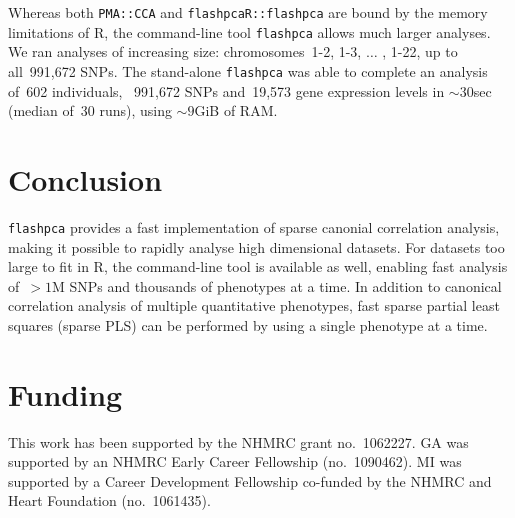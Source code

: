 \documentclass{bioinfo}
\begin{document}
Whereas both \texttt{PMA::CCA} and \texttt{flashpcaR::flashpca} are bound by the
memory limitations of \textsf{R}, the command-line tool \texttt{flashpca} allows
much larger analyses. We ran analyses of increasing size: chromosomes~1-2, 1-3,
$\hdots$ , 1-22, up to all~991,672 SNPs. The stand-alone \texttt{flashpca} was
able to complete an analysis of~602 individuals, ~991,672 SNPs and~19,573 gene
expression levels in ${\sim}30$sec (median of~30 runs), using ${\sim}9$GiB of
RAM.

\vspace*{-12pt}
\section{Conclusion}

\texttt{flashpca} provides a fast implementation of sparse canonial correlation
analysis, making it possible to rapidly analyse high dimensional datasets.  For
datasets too large to fit in \textsf{R}, the command-line tool is available as
well, enabling fast analysis of~${>}1$M SNPs and thousands of phenotypes at a
time.  In addition to canonical correlation analysis of multiple quantitative
phenotypes, fast sparse partial least squares (sparse PLS) can be performed by
using a single phenotype at a time.


\vspace*{-12pt}
\section*{Funding}

This work has been supported by the NHMRC grant no.~1062227. GA was supported by
an NHMRC Early Career Fellowship (no.~1090462). MI was supported by a Career
Development Fellowship co-funded by the NHMRC and Heart Foundation
(no.~1061435).

\vspace*{-12pt}




%
%
%
%
%
%
%
\end{document}
